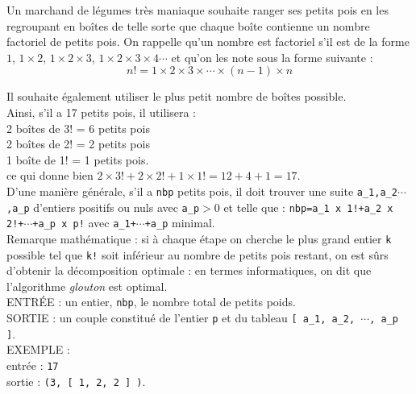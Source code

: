 \exer{}
\setcounter{numques}{0}

Un marchand de légumes très maniaque souhaite ranger ses petits pois en les regroupant en boîtes de 
telle sorte que chaque boîte contienne un nombre factoriel de petits pois. On rappelle qu'un nombre 
est factoriel s'il est de la forme $1$, $1 \times 2$, $1 \times 2 \times 3$, $1 \times 2 \times 3 
\times 4\cdots$ et qu'on les note sous la forme suivante :\\
$$n!=1\times 2\times 3\times \cdots\times (n-1)\times n$$

Il souhaite également utiliser le plus petit nombre de boîtes possible.\\
Ainsi, s'il a 17 petits pois, il utilisera :\\
   \hspace*{2cm} 2 boîtes de 3! = 6 petits pois\\
   \hspace*{2cm} 2 boîtes de 2! = 2 petits pois\\
   \hspace*{2cm} 1 boîte de 1! = 1 petits pois.\\
ce qui donne bien $2 \times 3! + 2 \times 2! + 1 \times 1! = 12 + 4 + 1 = 17$.\\

D'une manière générale, s'il a \texttt{nbp} petits pois, il doit trouver une suite 
\texttt{a\_1,a\_2$\cdots$,a\_p} d'entiers positifs ou nuls avec \texttt{a\_p}$>0$ et telle que :
\texttt{nbp=a\_1 x  1!+a\_2 x  2!+$\cdots$+a\_p x  p!} avec 
\texttt{a\_1+$\cdots$+a\_p} minimal. \\
Remarque mathématique : si à chaque étape on cherche le plus grand entier \texttt{k} possible tel 
que \texttt{k!} soit inférieur au nombre de petits pois restant, on est sûrs d'obtenir la 
décomposition optimale : en termes informatiques, on dit que l'algorithme \textit{glouton} est 
optimal.\\

\noindent ENTRÉE : un entier, \texttt{nbp}, le nombre total de petits poids.\\
\noindent SORTIE : un couple constitué de l'entier \texttt{p} et du tableau 
\texttt{[ a\_1, a\_2, $\cdots$, a\_p ]}.\\

\noindent EXEMPLE :\\
entrée : \texttt{17}\\
sortie : \texttt{(3, [ 1, 2, 2 ] )}.